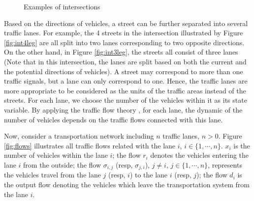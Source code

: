 \documentclass[preprint,authoryear,12pt]{elsarticle}
\begin{document}
\begin{figure}[ht]
  \centering
  \quad
  \caption{Examples of intersections}
\end{figure}

Based on the directions of vehicles, a street can be further
separated into several traffic lanes. For example, the 4 streets in
the intersection illustrated by Figure \ref{fig:int4leg} are all
split into two lanes corresponding to two opposite directions. On the
other hand, in Figure \ref{fig:int3leg}, the streets all consist of
three lanes (Note that in this intersection, the lanes are split
based on both the current and the potential directions of vehicles).
A street may correspond to more than one traffic signals, but a lane
can only correspond to one. Hence, the traffic lanes are more
appropriate to be considered as the units of the traffic areas
instead of the streets. For each lane, we choose the number of the
vehicles within it as its state variable. By applying the traffic
flow theory \citep{nathan_h_gartner_revised_2005}, for each lane, the
dynamic of the number of vehicles depends on the traffic flows
connected with this lane.

Now, consider a transportation network including $n$ traffic lanes,
$n>0$. Figure \ref{fig:flows} illustrates all traffic flows related
with the lane $i$, $i\in\{1,\cdots,n\}$. $x_i$ is the number of
vehicles within the lane $i$; the flow $r_i$ denotes the vehicles
entering the lane $i$ from the outside; the flow $\sigma_{i,j}$
(resp, $\sigma_{j,i}$), $j\neq i$, $j\in\{1,\cdots,n\}$, represents
the vehicles travel from the lane $j$ (resp, $i$) to the lane $i$
(resp, $j$); the flow $d_{i}$ is the output flow denoting the
vehicles which leave the transportation system from the lane $i$.
\end{document}
